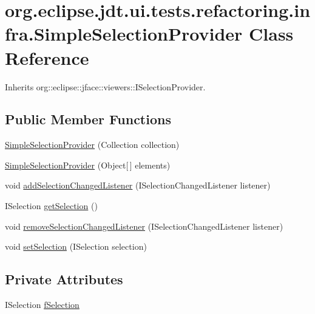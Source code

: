\hypertarget{classorg_1_1eclipse_1_1jdt_1_1ui_1_1tests_1_1refactoring_1_1infra_1_1SimpleSelectionProvider}{
\section{org.eclipse.jdt.ui.tests.refactoring.infra.SimpleSelectionProvider Class Reference}
\label{classorg_1_1eclipse_1_1jdt_1_1ui_1_1tests_1_1refactoring_1_1infra_1_1SimpleSelectionProvider}
}


Inherits org::eclipse::jface::viewers::ISelectionProvider.

\subsection*{Public Member Functions}
\begin{DoxyCompactItemize}
\item 
\hyperlink{classorg_1_1eclipse_1_1jdt_1_1ui_1_1tests_1_1refactoring_1_1infra_1_1SimpleSelectionProvider_a2d60c61051a93220037079e41de4c84d}{SimpleSelectionProvider} (Collection collection)
\item 
\hyperlink{classorg_1_1eclipse_1_1jdt_1_1ui_1_1tests_1_1refactoring_1_1infra_1_1SimpleSelectionProvider_ae11c43773a6d387f6f2bee76bd0f2bb3}{SimpleSelectionProvider} (Object\mbox{[}$\,$\mbox{]} elements)
\item 
void \hyperlink{classorg_1_1eclipse_1_1jdt_1_1ui_1_1tests_1_1refactoring_1_1infra_1_1SimpleSelectionProvider_abbc7d8d798ed84c8a2d0feb84f0bd91e}{addSelectionChangedListener} (ISelectionChangedListener listener)
\item 
ISelection \hyperlink{classorg_1_1eclipse_1_1jdt_1_1ui_1_1tests_1_1refactoring_1_1infra_1_1SimpleSelectionProvider_a5fc22550a876aa5cbd2774da14884c0e}{getSelection} ()
\item 
void \hyperlink{classorg_1_1eclipse_1_1jdt_1_1ui_1_1tests_1_1refactoring_1_1infra_1_1SimpleSelectionProvider_a5d328d87e0e9eb52e2fe8cf894539307}{removeSelectionChangedListener} (ISelectionChangedListener listener)
\item 
void \hyperlink{classorg_1_1eclipse_1_1jdt_1_1ui_1_1tests_1_1refactoring_1_1infra_1_1SimpleSelectionProvider_a480fe9d3869bb828e2f18051883eb61d}{setSelection} (ISelection selection)
\end{DoxyCompactItemize}
\subsection*{Private Attributes}
\begin{DoxyCompactItemize}
\item 
ISelection \hyperlink{classorg_1_1eclipse_1_1jdt_1_1ui_1_1tests_1_1refactoring_1_1infra_1_1SimpleSelectionProvider_a739d052e4cf4a81791e735fbed1a34db}{fSelection}
\end{DoxyCompactItemize}


